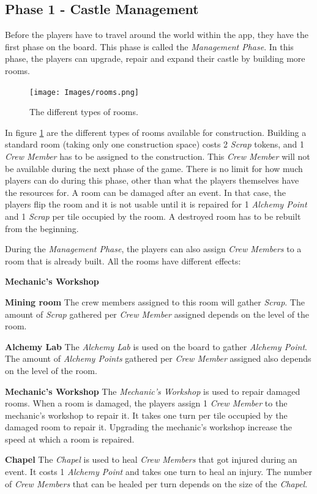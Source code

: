 \subsection{Phase 1 - Castle Management}
\label{sec:p1}
Before the players have to travel around the world within the app, they have the first phase on the board. This phase is called the \textit{Management Phase}. In this phase, the players can upgrade, repair and expand their castle by building more rooms.

\begin{figure}[!ht]
    \centering
    \texttt{[image: Images/rooms.png]}
    \caption{The different types of rooms.}
    \label{fig:roomtype}
\end{figure}

In figure \ref{fig:roomtype} are the different types of rooms available for construction. Building a standard room (taking only one construction space) costs 2 \textit{Scrap} tokens, and 1 \textit{Crew Member} has to be assigned to the construction. This \textit{Crew Member} will not be available during the next phase of the game.
There is no limit for how much players can do during this phase, other than what the players themselves have the resources for. A room can be damaged after an event. In that case, the players flip the room and it is not usable until it is repaired for 1 \textit{Alchemy Point} and 1 \textit{Scrap} per tile occupied by the room. A destroyed room has to be rebuilt from the beginning.



During the \textit{Management Phase}, the players can also assign \textit{Crew Members} to a room that is already built. All the rooms have different effects:
\begin{labeling}{\textbf{Mechanic's Workshop}}
\item[\textbf{Mining room}] The crew members assigned to this room will gather \textit{Scrap}. The amount of \textit{Scrap} gathered per \textit{Crew Member} assigned depends on the level of the room.
\item[\textbf{Alchemy Lab}] The \textit{Alchemy Lab} is used on the board to gather \textit{Alchemy Point}. The amount of \textit{Alchemy Points} gathered per \textit{Crew Member} assigned also depends on the level of the room.
\item[\textbf{Mechanic's Workshop}] The \textit{Mechanic's Workshop} is used to repair damaged rooms. When a room is damaged, the players assign 1 \textit{Crew Member} to the mechanic's workshop to repair it. It takes one turn per tile occupied by the damaged room to repair it. Upgrading the mechanic's workshop increase the speed at which a room is repaired.
\item[\textbf{Chapel}] The \textit{Chapel} is used to heal \textit{Crew Members} that got injured during an event. It costs 1 \textit{Alchemy Point} and takes one turn to heal an injury. The number of \textit{Crew Members} that can be healed per turn depends on the size of the \textit{Chapel}.
\end{labeling}

